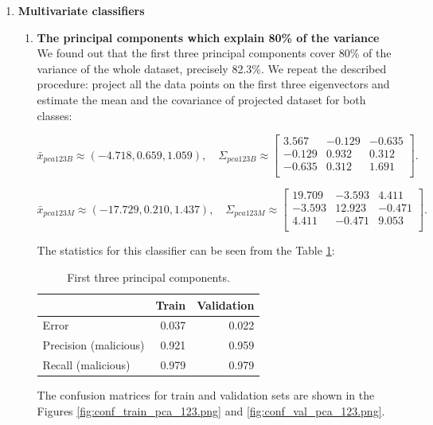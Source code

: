 \documentclass[11pt,a4paper]{article}
\begin{document}
\begin{enumerate}
\begin{enumerate}
		
	\end{enumerate}
	
	\item \textbf{Multivariate classifiers}
	\begin{enumerate}
		\item \textbf{The principal components which explain 80\% of the variance} \\
		We found out that the first three principal components cover 80\% of the variance of the whole dataset, precisely 82.3\%.
		We repeat the described procedure: project all the data points on the first three eigenvectors and estimate the mean and the covariance of projected dataset for both classes:
		
		\[
		\bar{x}_{pca123B} \approx (-4.718, 0.659,  1.059), \quad 
		\Sigma_{pca123B} \approx 
		\begin{bmatrix}
		3.567 & -0.129 & -0.635   \\
		-0.129 & 0.932 & 0.312  \\
		-0.635 & 0.312 & 1.691 \\
		\end{bmatrix}.
		\]
		
		\[
		\bar{x}_{pca123M} \approx (-17.729,  0.210, 1.437), \quad 
		\Sigma_{pca123M} \approx 
		\begin{bmatrix}
		19.709 & -3.593 & 4.411 \\
		-3.593 & 12.923 & -0.471   \\
		4.411 & -0.471 & 9.053 \\
		\end{bmatrix}.
		\]
		
		The statistics for this classifier can be seen from the Table \ref{tab:results-pca-123}:
		
		\begin{table}[H]
			\centering
			\begin{tabular}{lrr}
				\toprule
				& \textbf{Train} & \textbf{Validation}  \\ \midrule
				Error & 0.037 & 0.022 \\	
				Precision (malicious) & 0.921 & 0.959 \\
				Recall (malicious) & 0.979 & 0.979 \\
				\bottomrule
			\end{tabular}
			\caption{First three principal components.}
			\label{tab:results-pca-123}
		\end{table}
		
		The confusion matrices for train and validation sets are shown in the Figures \ref{fig:conf_train_pca_123.png} and \ref{fig:conf_val_pca_123.png}.
		

\end{enumerate}
\end{enumerate}
\end{document}

